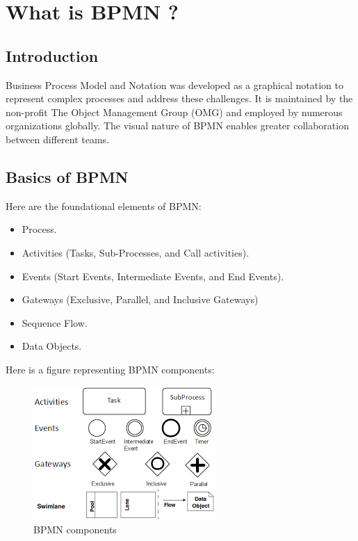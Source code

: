 \documentclass[12pt]{article}
\begin{document}
{  \pagebreak

  \section{What is BPMN ?}

  \subsection{Introduction}

  Business Process Model and Notation was developed as a graphical notation to represent complex processes and address these challenges. It is maintained by the non-profit The Object Management Group (OMG) and employed by numerous organizations globally. The visual nature of BPMN enables greater collaboration between different teams.

  \subsection{Basics of BPMN}

  Here are the foundational elements of BPMN:

  \begin{itemize}
    \item Process.
    \item Activities (Tasks, Sub-Processes, and Call activities).
    \item Events (Start Events, Intermediate Events, and End Events).
    \item Gateways (Exclusive, Parallel, and Inclusive Gateways)
    \item Sequence Flow.
    \item Data Objects.
  \end{itemize}

  \pagebreak

  Here is a figure representing BPMN components:

  \begin{figure}[h]
    \centering
    \includegraphics[width=.35\linewidth]{bpmn.png}
    \caption{BPMN components}
    \label{fig:bpmn}
  \end{figure}

}
\end{document}
